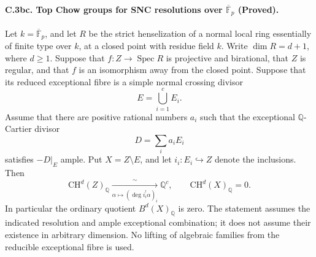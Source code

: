 \paragraph{C.3bc. Top Chow groups for SNC resolutions over
\(\overline{\mathbb F}_p\) (Proved).}
Let \(k=\overline{\mathbb F}_p\), and let \(R\) be the strict
henselization of a normal local ring essentially of finite type over
\(k\), at a closed point with residue field \(k\).
Write \(\dim R=d+1\), where \(d\geq1\).
Suppose that \(f:Z\to\operatorname{Spec}R\) is projective and
birational, that \(Z\) is regular, and that \(f\) is an isomorphism
away from the closed point. Suppose that its reduced exceptional
fibre is a simple normal crossing divisor
\[
                       E=\bigcup_{i=1}^{c}E_i.
\]
Assume that there are positive rational numbers \(a_i\) such that
the exceptional \(\mathbb Q\)-Cartier divisor
\[
                    D=\sum_i a_iE_i
\]
satisfies \(-D|_E\) ample. Put \(X=Z\setminus E\), and let
\(i_i:E_i\hookrightarrow Z\) denote the inclusions. Then
\begin{equation}\label{eq:C3bc-component-degrees}
 \mathrm{CH}^{d}(Z)_{\mathbb Q}
   \xrightarrow[\alpha\mapsto(\deg i_i^!\alpha)_i]{\ \sim\ }
                 \mathbb Q^{c},
 \qquad
                 \mathrm{CH}^{d}(X)_{\mathbb Q}=0.
\end{equation}
In particular the ordinary quotient \(B^d(X)_{\mathbb Q}\) is zero.
The statement assumes the indicated resolution and ample exceptional
combination; it does not assume their existence in arbitrary dimension.
No lifting of algebraic families from the reducible exceptional fibre
is used.

